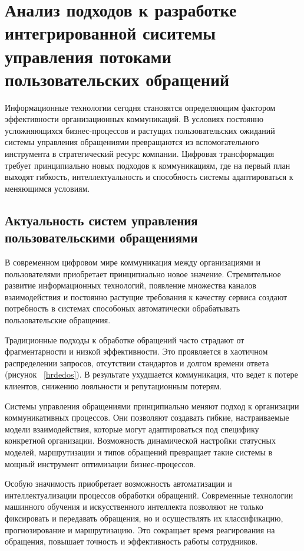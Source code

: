 \section{Анализ подходов к разработке интегрированной сиситемы управления потоками пользовательских обращений}
\label{sec:analysis}

Информационные технологии сегодня становятся определяющим фактором эффективности организационных коммуникаций. В условиях постоянно усложняющихся бизнес-процессов и растущих пользовательских ожиданий системы управления обращениями превращаются из вспомогательного инструмента в стратегический ресурс компании. Цифровая трансформация требует принципиально новых подходов к коммуникациям, где на первый план выходят гибкость, интеллектуальность и способность системы адаптироваться к меняющимся условиям.

\subsection{Актуальность систем управления пользовательскими обращениями}

В современном цифровом мире коммуникация между организациями и пользователями приобретает принципиально новое значение. Стремительное развитие информационных технологий, появление множества каналов взаимодействия и постоянно растущие требования к качеству сервиса создают потребность в системах способоных автоматически обрабатывать пользовательские обращения.

Традиционные подходы к обработке обращений часто страдают от фрагментарности и низкой эффективности. Это проявляется в хаотичном распределении запросов, отсутствии стандартов и долгом времени ответа (рисунок ~\ref{hrdedos}). В результате ухудшается коммуникация, что ведет к потере клиентов, снижению лояльности и репутационным потерям.


Системы управления обращениями принципиально меняют подход к организации коммуникативных процессов. Они позволяют создавать гибкие, настраиваемые модели взаимодействия, которые могут адаптироваться под специфику конкретной организации. Возможность динамической настройки статусных моделей, маршрутизации и типов обращений превращает такие системы в мощный инструмент оптимизации бизнес-процессов.

Особую значимость приобретает возможность автоматизации и интеллектуализации процессов обработки обращений. Современные технологии машинного обучения и искусственного интеллекта позволяют не только фиксировать и передавать обращения, но и осуществлять их  классификацию, прогнозирование и маршрутизацию. Это сокращает время реагирования на обращения, повышает точность и эффективность работы сотрудников.

